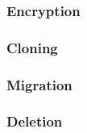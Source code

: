 \subsubsection{Encryption}
\label{llEncryption}

\subsubsection{Cloning}
\label{llCloning}

\subsubsection{Migration}
\label{llMigration}

\subsubsection{Deletion}
\label{llDeletion}
